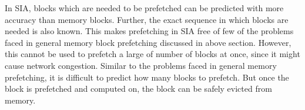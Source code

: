 In SIA, blocks which are needed to be prefetched can be predicted with more accuracy
than memory blocks. Further, the exact sequence in which blocks are needed is also known.
This makes prefetching in SIA free of few of the problems faced in general memory
block prefetching discussed in above section. However, this cannot be used to
prefetch a large of number of blocks at once, since it might cause network congestion.
Similar to the problems faced in general
memory prefetching, it is difficult to predict how many blocks to prefetch. But
once the block is prefetched and computed on, the block can be safely evicted from
memory.
